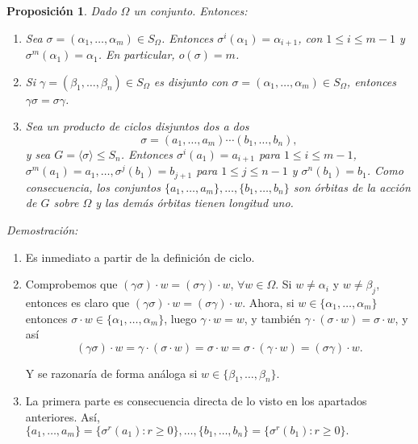 \documentclass[12pt]{article}
\newtheorem{proposition}[theorem]{Proposición}
\begin{document}
\begin{proposition}\label{eq:permCo} Dado $\Omega$ un conjunto. Entonces:
\begin{enumerate}
\item Sea $\sigma = (\alpha_1, \ldots, \alpha_m) \in S_\Omega$. Entonces $\sigma^i(\alpha_1) = \alpha_{i+1}$, con $1 \leq i \leq m-1$ y $\sigma^m(\alpha_1)=\alpha_1$. En particular, $o(\sigma) = m$.
\item Si $\gamma = (\beta_1, \ldots, \beta_n) \in S_\Omega$ es disjunto con $\sigma = (\alpha_1, \ldots, \alpha_m) \in S_\Omega$, entonces $\gamma \sigma = \sigma \gamma$.
\item Sea un producto de ciclos disjuntos dos a dos $$\sigma= (a_{1}, \ldots, a_{m}) \cdots (b_{1}, \ldots, b_{n}),$$ y sea $G =\langle \sigma \rangle \leq S_{n}$. Entonces $\sigma^{i}(a_{1}) = a_{i+1}$ para $1 \leq i \leq m-1$, $\sigma^{m}(a_{1})=a_{1}, \ldots, \sigma^{j}(b_{1})=b_{j+1}$ para $1 \leq j \leq n-1$ y $\sigma^{n}(b_{1})=b_{1}$. Como consecuencia, los conjuntos $\lbrace a_{1}, \ldots, a_{m} \rbrace, \ldots, \lbrace b_{1}, \ldots, b_{n}\rbrace$ son órbitas de la acción de $G$ sobre $\Omega$ y las demás órbitas tienen longitud uno.
\end{enumerate}
\end{proposition}
\emph{Demostración: }
\begin{enumerate}
\item Es inmediato a partir de la definición de ciclo. 
\item Comprobemos que $(\gamma \sigma) \cdot w = (\sigma \gamma) \cdot w$, $\forall w \in \Omega$. Si $w \neq \alpha_i$ y $w \neq \beta_j$, entonces es claro que $(\gamma \sigma) \cdot w = (\sigma \gamma) \cdot w$. Ahora, si $w \in \lbrace \alpha_1, \ldots, \alpha_m \rbrace$ entonces $\sigma \cdot w \in \lbrace \alpha_1, \ldots, \alpha_m \rbrace$, luego $\gamma \cdot w = w$, y también $\gamma \cdot (\sigma \cdot w) = \sigma \cdot w$, y así $$(\gamma \sigma) \cdot w = \gamma \cdot (\sigma \cdot w) = \sigma \cdot w = \sigma \cdot (\gamma \cdot w) = (\sigma \gamma) \cdot w.$$

Y se razonaría de forma análoga si $w \in \lbrace \beta_1, \ldots, \beta_n \rbrace$.
\item La primera parte es consecuencia directa de lo visto en los apartados anteriores. Así, $\lbrace a_{1}, \ldots, a_{m} \rbrace = \lbrace \sigma^{r}(a_{1}) : r \geq 0 \rbrace, \ldots, \lbrace b_{1}, \ldots, b_{n} \rbrace = \lbrace \sigma^{r}(b_{1}) : r \geq 0 \rbrace.$
\end{enumerate}
\end{document}
